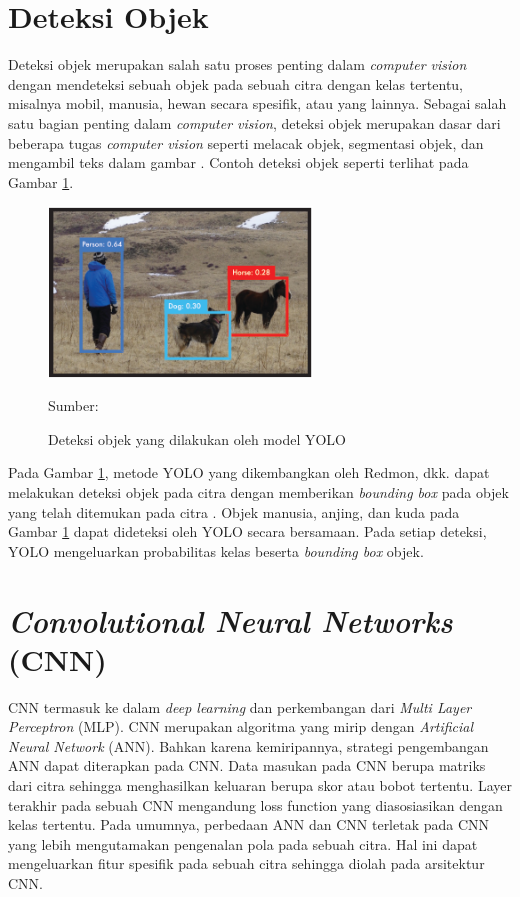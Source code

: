 \section{Deteksi Objek}
Deteksi objek merupakan salah satu proses penting dalam \textit{computer vision} dengan mendeteksi sebuah objek pada sebuah citra dengan kelas tertentu, misalnya mobil, manusia, hewan secara spesifik, atau yang lainnya. Sebagai salah satu bagian penting dalam \textit{computer vision}, deteksi objek merupakan dasar dari beberapa tugas \textit{computer vision} seperti melacak objek, segmentasi objek, dan mengambil teks dalam gambar \citep{Zou2019}. Contoh deteksi objek seperti terlihat pada Gambar \ref{fig:obj-det}.

\begin{figure}[H]
    \begin{center}
        \includegraphics[width=7cm]{img/bab2/object-detection.PNG}
        \caption{Deteksi objek yang dilakukan oleh model YOLO}
        \label{fig:obj-det}
        Sumber: \citep{Redmon2016a}
    \end{center}
\end{figure}

Pada Gambar \ref{fig:obj-det}, metode YOLO yang dikembangkan oleh Redmon, dkk. dapat melakukan deteksi objek pada citra dengan memberikan \textit{bounding box} pada objek yang telah ditemukan pada citra \citep{Redmon2016a}. Objek manusia, anjing, dan kuda pada Gambar \ref{fig:obj-det} dapat dideteksi oleh YOLO secara bersamaan. Pada setiap deteksi, YOLO mengeluarkan probabilitas kelas beserta \textit{bounding box} objek.

\section{\textit{Convolutional Neural Networks} (CNN)}
CNN termasuk ke dalam \textit{deep learning} dan perkembangan dari \textit{Multi Layer Perceptron} (MLP). CNN merupakan algoritma yang mirip dengan \textit{Artificial Neural Network} (ANN). Bahkan karena kemiripannya, strategi pengembangan ANN dapat diterapkan pada CNN. Data masukan pada CNN berupa matriks dari citra sehingga menghasilkan keluaran berupa skor atau bobot tertentu. Layer terakhir pada sebuah CNN mengandung loss function yang diasosiasikan dengan kelas tertentu. Pada umumnya, perbedaan ANN dan CNN terletak pada CNN yang lebih mengutamakan pengenalan pola pada sebuah citra. Hal ini dapat mengeluarkan fitur spesifik pada sebuah citra sehingga diolah pada arsitektur CNN.

